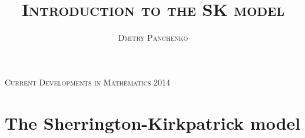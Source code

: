 \documentclass[12pt]{article}
\theoremstyle{nonumberplain}
\begin{document}
\title{\vspace{2cm}\textsc{Introduction to the SK model}}
\author{\textsc{Dmitry Panchenko}}
\date{}
\maketitle


\vspace{14cm}
\begin{center}
\textsc{Current Developments in Mathematics 2014}
\end{center}

\thispagestyle{empty}



\pagebreak

\tableofcontents

\thispagestyle{empty}

\pagebreak




\section{The Sherrington-Kirkpatrick model} 
\end{document}
